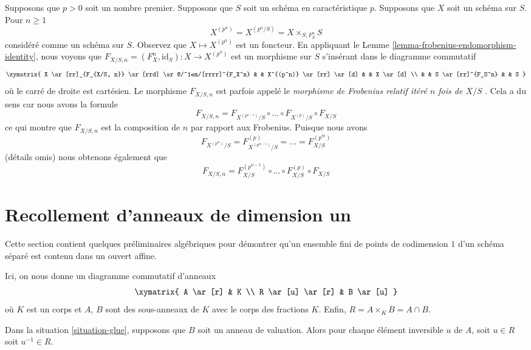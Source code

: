 \begin{remark}
\label{remark-n-fold-relative-frobenius}
Supposons que $p > 0$ soit un nombre premier. Supposons que $S$ soit un schéma
en caractéristique $p$. Supposons que $X$ soit un schéma sur $S$. Pour $n \geq 1$
$$
X^{(p^n)} = X^{(p^n/S)} = X \times_{S, F_S^n} S
$$
considéré comme un schéma sur $S$. Observez que $X \mapsto
X^{(p^n)}$ est un foncteur. En appliquant le Lemme
\ref{lemma-frobenius-endomorphism-identity}, nous voyons que
$F_{X/S, n} = (F_X^n, \text{id}_S) : X \longrightarrow X^{(p^n)}$
est un morphisme sur $S$ s'insérant dans le diagramme commutatif
$$
\xymatrix{
X \ar[rr]_{F_{X/S, n}} \ar[rrd] \ar@/^1em/[rrrr]^{F_X^n}
& & X^{(p^n)} \ar[rr] \ar[d] & & X \ar[d] \\
& & S \ar[rr]^{F_S^n} & & S
}
$$
où le carré de droite est cartésien. Le
morphisme $F_{X/S, n}$ est parfois appelé le {\it
morphisme de Frobenius relatif itéré $n$ fois de
$X/S$ }. Cela a du sens car nous avons la formule
$$
F_{X/S, n} =
F_{X^{(p^{n - 1})}/S} \circ \ldots \circ F_{X^{(p)}/S} \circ F_{X/S}
$$
ce qui montre que $F_{X/S, n}$ est la composition
de $n$ par rapport aux Frobenius. Puisque nous avons
$$
F_{X^{(p^m)}/S} = F_{X^{(p^{m - 1})}/S}^{(p)} = \ldots = F_{X/S}^{(p^m)}
$$
(détails omis) nous obtenons également que
$$
F_{X/S, n} =
F_{X/S}^{(p^{n - 1})} \circ \ldots \circ F_{X/S}^{(p)} \circ F_{X/S}
$$
\end{remark}




\section{Recollement d'anneaux de dimension un}
\label{section-glueing-dim-1}

\noindent
Cette section contient quelques préliminaires algébriques
pour démontrer qu'un ensemble fini de points de codimension
$1$ d'un schéma séparé est contenu dans un ouvert affine.

\begin{situation}
\label{situation-glue}
Ici, on nous donne un diagramme commutatif d'anneaux
$$
\xymatrix{
A \ar[r] & K \\
R \ar[u] \ar[r] & B \ar[u]
}
$$
où $K$ est un corps et $A$, $B$ sont des sous-anneaux de $K$ avec
le corps des fractions $K$. Enfin, $R = A \times_K B = A \cap B$.
\end{situation}

\begin{lemma}
\label{lemma-glue-valuation-ring}
Dans la situation \ref{situation-glue}, supposons que $B$ soit un anneau de valuation.
Alors pour chaque élément inversible $u$ de $A$, soit $u \in R$ soit $u^{-1} \in R$.
\end{lemma}

